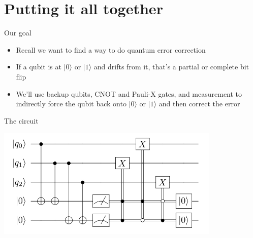 \documentclass[aspectratio=169, handout]{beamer}
\begin{document}
\section{Putting it all together}
\frame{\sectionpage}

\begin{frame}{Our goal}
    \begin{itemize}
        \item Recall we want to find a way to do quantum error correction \pause
        \item If a qubit is at $|0\rangle$ or $|1\rangle$ and drifts from it, that's a partial or complete bit flip \pause
        \item We'll use backup qubits, CNOT and Pauli-X gates, and measurement to indirectly force the qubit back onto $|0\rangle$ or $|1\rangle$ and then correct the error
    \end{itemize}
\end{frame}

\begin{frame}{The circuit}
\begin{center}
    \includegraphics[width=0.8\textwidth]{bitflipcode.png}\nocite{site:xkcd}
\end{center}
\end{frame}
\end{document}

